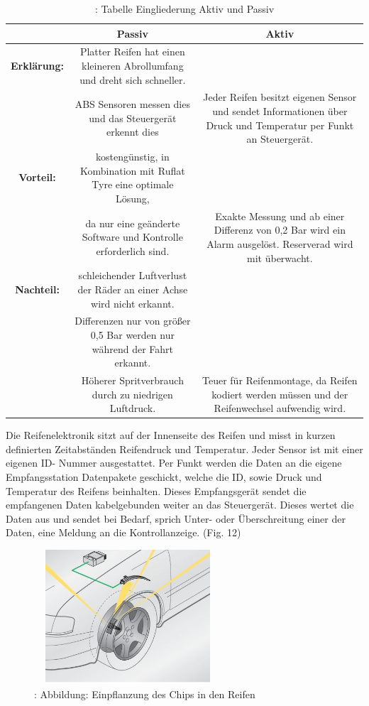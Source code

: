 				\begin{table}	
					\begin{tabular}{c|c|c}
						
						\textbf {  } & \textbf{Passiv} & \textbf {Aktiv}\\
						
						
						\hline
						\textbf{Erklärung:} & Platter Reifen hat einen kleineren Abrollumfang und dreht sich schneller.\\&ABS Sensoren messen dies und das Steuergerät erkennt dies & Jeder Reifen besitzt eigenen Sensor und sendet Informationen über Druck und Temperatur per Funkt an Steuergerät.\\
						
						
						\hline
						\textbf{Vorteil:} & kostengünstig, in Kombination mit Ruflat Tyre eine optimale Lösung, \\&da nur eine geänderte Software und Kontrolle erforderlich sind. & Exakte Messung und ab einer Differenz von 0,2 Bar wird ein Alarm ausgelöst. Reserverad wird mit überwacht.\\
								
	
						\hline
						\textbf{Nachteil:} & schleichender Luftverlust der Räder an einer Achse wird nicht erkannt.\\&Differenzen nur von größer 0,5 Bar werden nur während der Fahrt erkannt.\\&  Höherer Spritverbrauch durch zu niedrigen Luftdruck. & Teuer für Reifenmontage, da Reifen kodiert werden müssen und der Reifenwechsel aufwendig wird.\\
						\hline
					
					\end{tabular}
				\caption{ \cite{TS_rdks}: Tabelle Eingliederung Aktiv und Passiv}
				\end{table}	
						
				Die Reifenelektronik sitzt auf der Innenseite des Reifen und misst in kurzen definierten Zeitabständen Reifendruck und Temperatur. Jeder Sensor ist mit einer eigenen ID- Nummer ausgestattet. Per Funkt werden die Daten an die eigene Empfangsstation Datenpakete geschickt, welche die ID, sowie Druck und Temperatur des Reifens beinhalten. Dieses Empfangsgerät sendet die empfangenen Daten kabelgebunden weiter an das Steuergerät. Dieses wertet die Daten aus und sendet bei Bedarf, sprich Unter- oder Überschreitung einer der Daten, eine Meldung an die Kontrollanzeige. (Fig. 12)
					
				\begin{figure}
					\centering
					\includegraphics[width=7cm, height=5cm] {rdks.png}
					\caption {\cite{TS_rdks_pic}: Abbildung: Einpflanzung des Chips in den Reifen}
				\end{figure}
				
